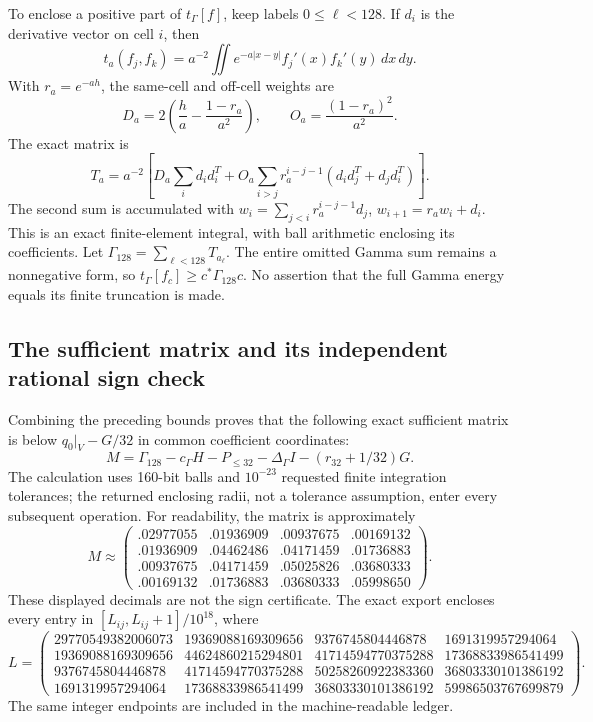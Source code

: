 \documentclass[11pt,a4paper]{article}
\numberwithin{equation}{section}
\theoremstyle{definition}\newtheorem{definition}[theorem]{Definition}
\theoremstyle{remark}\newtheorem{remark}[theorem]{Remark}
\begin{document}
To enclose a positive part of $t_\Gamma[f]$, keep labels $0\le\ell<128$.
If $d_i$ is the derivative vector on cell $i$, then
\[
 t_a(f_j,f_k)=a^{-2}\iint e^{-a|x-y|}f_j'(x)f_k'(y)\,dx\,dy.
\]
With $r_a=e^{-ah}$, the same-cell and off-cell weights are
\[
 D_a=2\left(\frac h a-\frac{1-r_a}{a^2}\right),\qquad
 O_a=\frac{(1-r_a)^2}{a^2}.
\]
The exact matrix is
\begin{equation}\label{fz:eq:recurrence}
 T_a=a^{-2}\left[D_a\sum_i d_id_i^T
 +O_a\sum_{i>j}r_a^{i-j-1}(d_id_j^T+d_jd_i^T)\right].
\end{equation}
The second sum is accumulated with
$w_i=\sum_{j<i}r_a^{i-j-1}d_j$, $w_{i+1}=r_aw_i+d_i$.
This is an exact finite-element integral, with ball arithmetic enclosing
its coefficients. Let $\Gamma_{128}=\sum_{\ell<128}T_{a_\ell}$.
The entire omitted Gamma sum remains a nonnegative form, so
$t_\Gamma[f_c]\ge c^*\Gamma_{128}c$. No assertion that the full Gamma
energy equals its finite truncation is made.

\subsection{The sufficient matrix and its independent rational sign check}

Combining the preceding bounds proves that the following exact sufficient
matrix is below $q_0|_V-G/32$ in common coefficient coordinates:
\begin{equation}\label{fz:eq:certificate}
 M=\Gamma_{128}-c_\Gamma H-P_{\le32}
       -\Delta_\Gamma I-(r_{32}+1/32)G.
\end{equation}
The calculation uses 160-bit balls and $10^{-23}$ requested finite
integration tolerances; the returned enclosing radii, not a tolerance
assumption, enter every subsequent operation. For readability, the
matrix is approximately
\[
 M\approx\begin{pmatrix}
 .02977055&.01936909&.00937675&.00169132\\
 .01936909&.04462486&.04171459&.01736883\\
 .00937675&.04171459&.05025826&.03680333\\
 .00169132&.01736883&.03680333&.05998650
 \end{pmatrix}.
\]
These displayed decimals are not the sign certificate. The exact export
encloses every entry in $[L_{ij},L_{ij}+1]/10^{18}$, where
{\setlength{\arraycolsep}{4pt}
\[
L=\begin{pmatrix}
29770549382006073&19369088169309656&9376745804446878&1691319957294064\\
19369088169309656&44624860215294801&41714594770375288&17368833986541499\\
9376745804446878&41714594770375288&50258260922383360&36803330101386192\\
1691319957294064&17368833986541499&36803330101386192&59986503767699879
\end{pmatrix}.
\]
}
The same integer endpoints are included in the machine-readable ledger.
\end{document}
